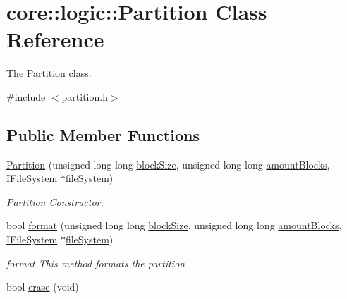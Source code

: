 \hypertarget{classcore_1_1logic_1_1_partition}{}\section{core\+:\+:logic\+:\+:Partition Class Reference}
\label{classcore_1_1logic_1_1_partition}


The \mbox{\hyperlink{classcore_1_1logic_1_1_partition}{Partition}} class.  




{\ttfamily \#include $<$partition.\+h$>$}

\subsection*{Public Member Functions}
\begin{DoxyCompactItemize}
\item 
\mbox{\hyperlink{classcore_1_1logic_1_1_partition_ad4a50cfda17b7996c8b1480e8701cf3a}{Partition}} (unsigned long long \mbox{\hyperlink{classcore_1_1logic_1_1_partition_ad3fb03e884170c6068b6724f1121ecc6}{block\+Size}}, unsigned long long \mbox{\hyperlink{classcore_1_1logic_1_1_partition_a28f8b672dccb67a06036e223be813950}{amount\+Blocks}}, \mbox{\hyperlink{classcore_1_1_i_file_system}{I\+File\+System}} $\ast$\mbox{\hyperlink{classcore_1_1logic_1_1_partition_a37dd86b3bc84bc1c7463beaf6d3adc57}{file\+System}})
\begin{DoxyCompactList}\small\item\em \mbox{\hyperlink{classcore_1_1logic_1_1_partition}{Partition}} Constructor. \end{DoxyCompactList}\item 
bool \mbox{\hyperlink{classcore_1_1logic_1_1_partition_a6530ca85e608e3af7243ac2b32e4c4e5}{format}} (unsigned long long \mbox{\hyperlink{classcore_1_1logic_1_1_partition_ad3fb03e884170c6068b6724f1121ecc6}{block\+Size}}, unsigned long long \mbox{\hyperlink{classcore_1_1logic_1_1_partition_a28f8b672dccb67a06036e223be813950}{amount\+Blocks}}, \mbox{\hyperlink{classcore_1_1_i_file_system}{I\+File\+System}} $\ast$\mbox{\hyperlink{classcore_1_1logic_1_1_partition_a37dd86b3bc84bc1c7463beaf6d3adc57}{file\+System}})
\begin{DoxyCompactList}\small\item\em format This method formats the partition \end{DoxyCompactList}\item 
bool \mbox{\hyperlink{classcore_1_1logic_1_1_partition_a43ea90c84d2d9b90e665efbc06d5d626}{erase}} (void)

\end{DoxyCompactItemize}
